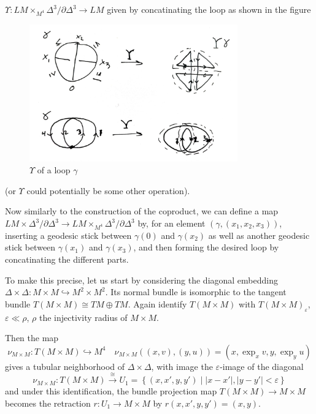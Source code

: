 \documentclass[reqno]{amsart}
\theoremstyle{definition}
\theoremstyle{remark}
\begin{document}
$\Upsilon \colon LM \times_{M^{4}} \Delta^3 / \partial \Delta^3 \to 
LM$ given by
concatinating the loop as shown in the figure

\begin{figure}[htpb]
    \centering
    \includegraphics[width=0.8\textwidth]{Figures/UGWINZKQ.jpeg}
    \caption{$\Upsilon$ of a loop $\gamma$}
    \label{fig:Figures-UGWINZKQ-jpeg}
\end{figure}



(or $\Upsilon$ could potentially be some other operation).


Now similarly to the construction of the coproduct, we can define a map
$LM \times \Delta^{3} /\partial \Delta^3 \to LM \times_{M^{4}} \Delta^{3}
/ \partial \Delta^3$ by,
for an element
$\left( \gamma, \left( x_1,x_2,x_3 \right)  \right) $, inserting
a geodesic stick between $\gamma(0)$ and $\gamma(x_2)$ as well
as another geodesic stick between $\gamma(x_1)$ and 
$\gamma(x_3)$, and then forming the desired loop by concatinating
the different parts.


To make this precise, let us start by
considering the diagonal embedding
$\Delta \times \Delta \colon M \times M 
\hookrightarrow M^2 \times M^2$.
Its normal bundle is isomorphic to
the tangent bundle $T(M \times M) \cong TM \oplus TM$.
Again identify $T\left( M \times M \right) $ with
$T\left( M \times M \right)_{\varepsilon}$,
$\varepsilon \ll \rho$, $\rho$ the injectivity radius of $M \times M$.

Then the map
\[
\nu_{M \times M} \colon T\left( M \times M \right) 
\hookrightarrow M^{4} \quad
\nu_{M \times M}\left( \left( x,v \right) ,
\left( y,u \right) \right) =
\left( x, \exp_x v, y, \exp_y u \right) 
\] 
gives a tubular neighborhood
of $\Delta \times \Delta$, with image the
$\varepsilon$-image of the diagonal
\[
\nu_{M \times M} \colon T\left( M \times M \right) 
\stackrel{\cong}{\to} U_1 
= \left\{ \left( x,x',y,y' \right)  \mid 
\left| x-x' \right| , \left| y-y' \right| < \varepsilon \right\} 
\] 
and under this identification, the bundle projection
map $T\left( M \times M \right) \to M \times M$ becomes
the retraction
$r \colon U_1 \to M \times M$ by
$r\left( x,x',y,y' \right) = \left( x,y \right) $.
\end{document}
